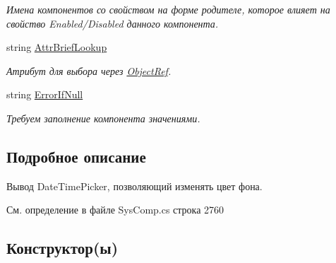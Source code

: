 \begin{DoxyCompactItemize}
\begin{DoxyCompactList}\small\item\em Имена компонентов со свойством на форме родителе, которое влияет на свойство Enabled/\+Disabled данного компонента. ~\newline
\end{DoxyCompactList}\item 
string \mbox{\hyperlink{class_f_b_a_1_1_date_time_picker_f_b_a_a66eca309b193d5a3e66f45b48dfe9b49}{Attr\+Brief\+Lookup}}
\begin{DoxyCompactList}\small\item\em Атрибут для выбора через \mbox{\hyperlink{class_f_b_a_1_1_object_ref}{Object\+Ref}}. ~\newline
\end{DoxyCompactList}\item 
string \mbox{\hyperlink{class_f_b_a_1_1_date_time_picker_f_b_a_a9da67cf70cb89ba44813459a1b312f41}{Error\+If\+Null}}
\begin{DoxyCompactList}\small\item\em Требуем заполнение компонента значениями. ~\newline
\end{DoxyCompactList}\end{DoxyCompactItemize}


\subsection{Подробное описание}
Вывод Date\+Time\+Picker, позволяющий изменять цвет фона. 



См. определение в файле Sys\+Comp.\+cs строка 2760



\subsection{Конструктор(ы)}
\mbox{\label{class_f_b_a_1_1_date_time_picker_f_b_a_a623bbcddcf5145941afe2d87e51749a5}} 
